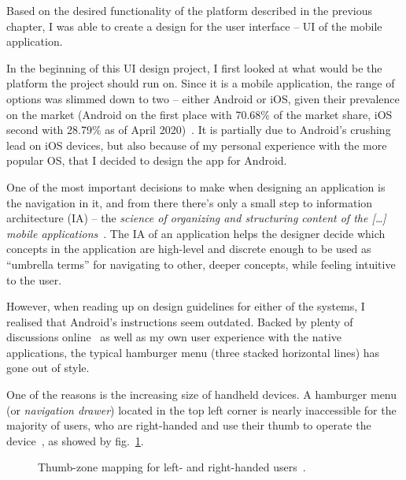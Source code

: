 Based on the desired functionality of the platform described in the previous chapter, I was able to create a design for the user interface -- UI of the mobile application.

In the beginning of this UI design project, I first looked at what would be the platform the project should run on.
Since it is a mobile application, the range of options was slimmed down to two -- either Android or iOS,
given their prevalence on the market (Android on the first place with 70.68\% of the market share, iOS second with 28.79\% as of April 2020)~\cite{market-share-mobile-os}.
It is partially due to Android's crushing lead on iOS devices, but also because of my personal experience with the more popular OS, that I decided to design the app for Android.

One of the most important decisions to make when designing an application is the navigation in it, and from there there's only a small step to information architecture (IA) -- the \textit{science of organizing and structuring content of the [\dots] mobile applications}~\cite{information-architecture}.
The IA of an application helps the designer decide which concepts in the application are high-level and discrete enough
to be used as ``umbrella terms'' for navigating to other, deeper concepts, while feeling intuitive to the user.

However, when reading up on design guidelines for either of the systems, I realised that Android's instructions seem outdated.
Backed by plenty of discussions online~\cite{hamburger-discoverabillity} as well as my own user experience with the native applications, the typical hamburger menu (three stacked horizontal lines) has gone out of style.

One of the reasons is the increasing size of handheld devices.
A hamburger menu (or \textit{navigation drawer}) located in the top left corner is nearly inaccessible for the majority of users, who are right-handed and use their thumb to operate the device~\cite{thumb-zone-article}, as showed by fig.~\ref{fig:thumb-zone-img}.

\begin{figure}[h!]
    \centering
    \hfill
    \caption{Thumb-zone mapping for left- and right-handed users~\cite{thumb-zone-img}.}
    \label{fig:thumb-zone-img}
\end{figure}

